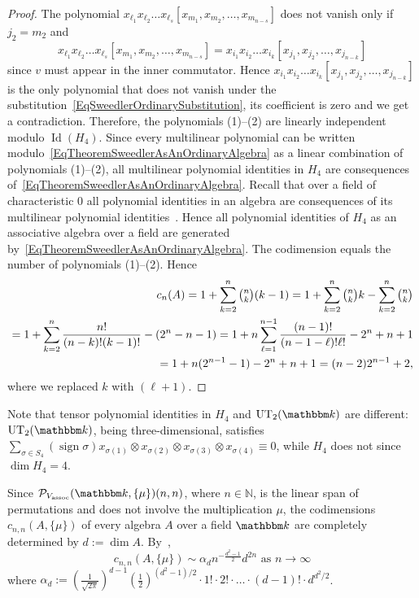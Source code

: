 \documentclass[12pt, reqno, a4paper]{amsart}
\theoremstyle{plain}
\theoremstyle{remark}
\theoremstyle{definition}
\numberwithin{equation}{section}
\DeclareMathOperator{\Id}{Id}
\DeclareMathOperator{\sign}{sign}
\begin{document}
\begin{proof}
 The polynomial $x_{\ell_1} x_{\ell_2}\ldots x_{\ell_s}[x_{m_1}, x_{m_2}, \ldots, x_{m_{n-s}}]$ does not 
vanish only if $j_2 = m_2$ and $$x_{\ell_1} x_{\ell_2}\ldots x_{\ell_s}[x_{m_1}, x_{m_2}, \ldots, x_{m_{n-s}}] = x_{i_1} x_{i_2}\ldots x_{i_k}[x_{j_1}, x_{j_2}, \ldots, x_{j_{n-k}}]$$ since $v$ must appear in the inner commutator.
Hence $x_{i_1} x_{i_2}\ldots x_{i_k}[x_{j_1}, x_{j_2}, \ldots, x_{j_{n-k}}]$ is the only polynomial that does not vanish under
the substitution~\eqref{EqSweedlerOrdinarySubstitution}, its coefficient is zero and we get a contradiction. Therefore, the polynomials (1)--(2) are linearly independent modulo $\Id(H_4)$. Since every multilinear polynomial can be written modulo~\eqref{EqTheoremSweedlerAsAnOrdinaryAlgebra} as a linear combination
of polynomials (1)--(2), all multilinear polynomial identities in $H_4$ are consequences of~\eqref{EqTheoremSweedlerAsAnOrdinaryAlgebra}.
 Recall that over a field of characteristic $0$ all polynomial identities in an algebra are consequences of its multilinear polynomial identities~\cite[Theorem 1.3.8]{GiaZai}. Hence all polynomial identities of $H_4$ as an associative algebra over a field are generated by~\eqref{EqTheoremSweedlerAsAnOrdinaryAlgebra}.
 The codimension equals the number of polynomials (1)--(2). Hence
 \begin{equation*}\begin{split}c_n(A)= 1 + \sum\limits_{k=2}^n \tbinom{n}{k} (k-1)
 = 1 +  \sum\limits_{k=2}^n \tbinom{n}{k} k - \sum\limits_{k=2}^n \tbinom{n}{k} \\ = 1 +
 \sum\limits_{k=2}^n \frac{n!}{(n-k)!(k-1)!} - (2^n - n-1 ) =  1  + n \sum\limits_{\ell=1}^{n-1} \frac{(n-1)!}{(n-1-\ell)!\ell!}
 - 2^n+n+1 \\= 1 + n (2^{n-1}-1) - 2^n+n+1 = (n-2)2^{n-1} + 2,
 \end{split}\end{equation*}
 where we replaced $k$ with $(\ell+1)$.
\end{proof}	

Note that tensor polynomial identities in $H_4$ and $\mathrm{UT}_2(\mathbbm k)$ are different: 
$\mathrm{UT}_2(\mathbbm k)$, being three-dimensional, satisfies $\sum\limits_{\sigma\in S_4} (\sign \sigma) x_{\sigma(1)}\otimes x_{\sigma(2)} \otimes x_{\sigma(3)}\otimes x_{\sigma(4)}\equiv 0$, while $H_4$ does not since $\dim H_4 = 4$.

Since $\mathcal P_{V_\mathrm{assoc}}(\mathbbm k, \lbrace \mu \rbrace)(n,n)$, where $n\in\mathbb N$,
is the linear span of permutations and does not involve the multiplication $\mu$,
the codimensions $c_{n,n}(A,\lbrace \mu \rbrace)$ of every algebra $A$ over a field $\mathbbm k$ are completely determined by $d:=\dim A$. By~\cite[Theorem~5.1]{ASGordienko23},
$$ c_{n,n}(A,\lbrace \mu \rbrace)
\sim \alpha_d n^{-\frac{d^2-1}{2}}
d^{2n} \text{ as }n\to\infty$$
where $\alpha_d := \left(\frac{1}{\sqrt{2\pi}}\right)^{d-1}
\left(\frac{1}{2}\right)^{(d^2-1)/2} \cdot 1! \cdot 2! \cdot\ldots
\cdot (d-1)! \cdot d^{d^2/2}$.
\end{document}
